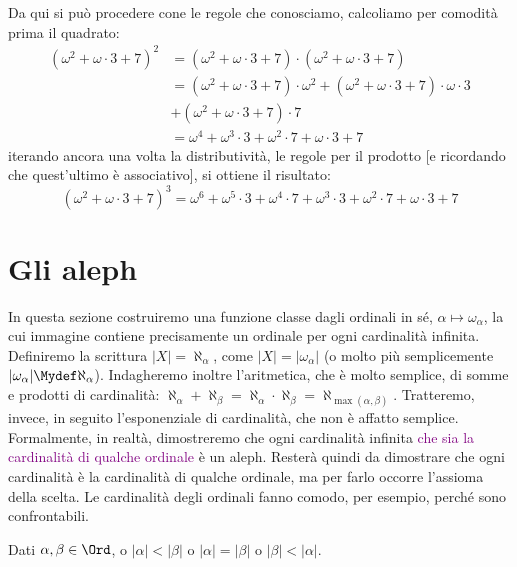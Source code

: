 \documentclass[11pt]{scrartcl}
\begin{document}
\begin{example}
\begin{itemize}
		Da qui si può procedere cone le regole che conosciamo, calcoliamo per comodità prima il quadrato:
		\[ \begin{split}
			(\omega^2 + \omega \cdot 3 + 7)^2 &= (\omega^2 + \omega \cdot 3 + 7) \cdot (\omega^2 + \omega \cdot 3 + 7) \\
											  &= (\omega^2 + \omega \cdot 3 + 7) \cdot \omega^2 + (\omega^2 + \omega \cdot 3 + 7) \cdot \omega \cdot 3 \\
											  &+ (\omega^2 + \omega \cdot 3 + 7) \cdot 7 \\
											  &= \omega^4 + \omega^3 \cdot 3 + \omega^2\cdot 7 + \omega \cdot 3 + 7
		\end{split}
			\]
		iterando ancora una volta la distributività, le regole per il prodotto [e ricordando che quest'ultimo è associativo], si ottiene il risultato:
		\[ (\omega^2 + \omega \cdot 3 + 7)^3 = \omega^6 + \omega^5 \cdot 3 + \omega^4 \cdot 7 + \omega^3 \cdot 3 + \omega^2\cdot 7 + \omega \cdot 3 + 7
			\]
	\end{itemize}
\end{example}

\pagebreak
\section{Gli aleph}
In questa sezione costruiremo una funzione classe dagli ordinali in sé, $\alpha \mapsto \omega_\alpha$, la cui immagine contiene precisamente un ordinale per ogni cardinalità infinita.
Definiremo la scrittura $|X| = \aleph_\alpha$, come $|X| = |\omega_\alpha|$ (o molto più semplicemente $|\omega_\alpha| \Mydef \aleph_\alpha$). Indagheremo inoltre l'aritmetica, che è molto semplice, di somme e prodotti di cardinalità: $\aleph_\alpha + \aleph_\beta = \aleph_\alpha \cdot \aleph_\beta = \aleph_{\max(\alpha,\beta)}$.
Tratteremo, invece, in seguito l'esponenziale di cardinalità, che non è affatto semplice.\\
Formalmente, in realtà, dimostreremo che ogni cardinalità infinita \textcolor{purple}{che sia la cardinalità di qualche ordinale} è un aleph. Resterà quindi da dimostrare che ogni cardinalità è la cardinalità di qualche ordinale, ma per farlo occorre l'assioma della scelta.
Le cardinalità degli ordinali fanno comodo, per esempio, perché sono confrontabili.

\begin{remark}
	Dati $\alpha,\beta \in \Ord$, o $|\alpha| < |\beta|$ o $|\alpha| = |\beta|$ o $|\beta| < |\alpha|$.
\end{remark}
\end{document}
